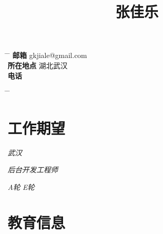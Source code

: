 \documentclass[10pt]{article} %
\begin{document}

\title{张佳乐} %


\parbox{0.5\textwidth}{ %
\begin{tabbing} %
\hspace{3cm} \= \hspace{4cm} \= \kill %
{\bf 邮箱} \> gkjiale@gmail.com\\ %
{\bf 所在地点} \> 湖北武汉 \\ %
{\bf 电话} \\ %
\end{tabbing}}
\hfill %
\parbox{0.5\textwidth}{ %
\begin{tabbing} %
\hspace{3cm} \= \hspace{4cm} \= \kill %
\end{tabbing}}

\section{ 工作期望}

{
\textit{武汉}
}

{
\textit{后台开发工程师}
}

{
\textit{A轮}
\textit{E轮}
}

\section{教育信息}
\end{document}
